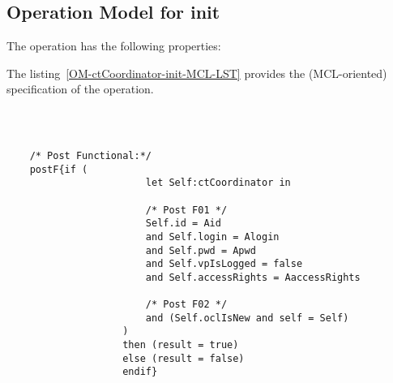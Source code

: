 \subsection{Operation Model for init}

\label{OM-init}


The  operation has the following properties:

	\begin{operationmodel}



		


	\end{operationmodel}



	\vspace{1cm}
	The listing~\ref{OM-ctCoordinator-init-MCL-LST} provides the \msrmessir (MCL-oriented) specification of the operation.
	
	\scriptsize
	\vspace{0.5cm}
	\begin{lstlisting}[style=MessirStyle,firstnumber=auto,captionpos=b,caption={\msrmessir (MCL-oriented) specification of the operation \emph{init}.},label=OM-ctCoordinator-init-MCL-LST]

	
	
	/* Post Functional:*/ 
	postF{if (
						let Self:ctCoordinator in
						
						/* Post F01 */
						Self.id = Aid
						and Self.login = Alogin
						and Self.pwd = Apwd
						and Self.vpIsLogged = false
						and Self.accessRights = AaccessRights
	
						/* Post F02 */
						and (Self.oclIsNew and self = Self)
					)
					then (result = true)
					else (result = false)
					endif}
	
	
	\end{lstlisting}
	\normalsize 
	
	
	
	





